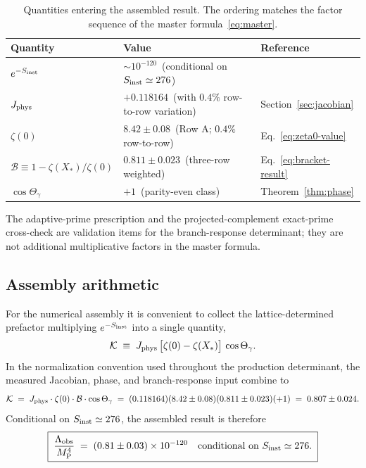 \documentclass[a4paper,11pt]{article}
\theoremstyle{definition}
\newcommand{\MP}{M_{\rm P}}
\newcommand{\Lobs}{\Lambda_{\rm obs}}
\newcommand{\Jphys}{J_{\rm phys}}
\newcommand{\Bobs}{\mathcal{B}}
\begin{document}
\begin{table}[h]
\centering
\begin{tabular}{lll}
\toprule
Quantity & Value & Reference \\
\midrule
$e^{-S_{\rm inst}}$
  & $\sim 10^{-120}$ \,(conditional on $S_{\rm inst} \simeq 276$)
  & \cite{companion-structural} \\
$\Jphys$
  & $+0.118164$ \,(with $0.4\%$ row-to-row variation)
  & Section~\ref{sec:jacobian} \\
$\zeta(0)$
  & $8.42 \pm 0.08$ \,(Row A; $0.4\%$ row-to-row)
  & Eq.~\eqref{eq:zeta0-value} \\
$\Bobs \equiv 1 - \zeta(X_*)/\zeta(0)$
  & $0.811 \pm 0.023$ \,(three-row weighted)
  & Eq.~\eqref{eq:bracket-result} \\
$\cos\Theta_\gamma$
  & $+1$ \,(parity-even class)
  & Theorem~\ref{thm:phase} \\
\bottomrule
\end{tabular}
\caption{Quantities entering the assembled result. The ordering
matches the factor sequence of the master
formula~\eqref{eq:master}.}
\label{tab:assembly}
\end{table}

The adaptive-prime prescription and the projected-complement
exact-prime cross-check are validation items for the branch-response
determinant; they are not additional multiplicative factors in the
master formula.

\subsection{Assembly arithmetic}
\label{subsec:assembly-arithmetic}

For the numerical assembly it is convenient to collect the
lattice-determined prefactor multiplying $e^{-S_{\rm inst}}$ into a
single quantity,
\begin{equation}
\mathcal{K}
\;\equiv\;
\Jphys\,\bigl[\zeta(0) - \zeta(X_*)\bigr]\,\cos\Theta_\gamma .
\label{eq:K-def}
\end{equation}
In the normalization convention used throughout the production
determinant, the measured Jacobian, phase, and branch-response
input combine to
\begin{equation}
\mathcal{K} \;=\; \Jphys \cdot \zeta(0) \cdot \Bobs \cdot \cos\Theta_\gamma
\;=\; (0.118164)(8.42 \pm 0.08)(0.811 \pm 0.023)(+1)
\;=\; 0.807 \pm 0.024.
\label{eq:K-value}
\end{equation}
Conditional on $S_{\rm inst} \simeq 276$, the assembled result is
therefore
\begin{equation}
\boxed{\;
\frac{\Lobs}{\MP^4}
\;=\;
(0.81 \pm 0.03) \times 10^{-120}
\quad
\text{conditional on}\ S_{\rm inst} \simeq 276.
\;}
\label{eq:assembled-result}
\end{equation}
\end{document}
